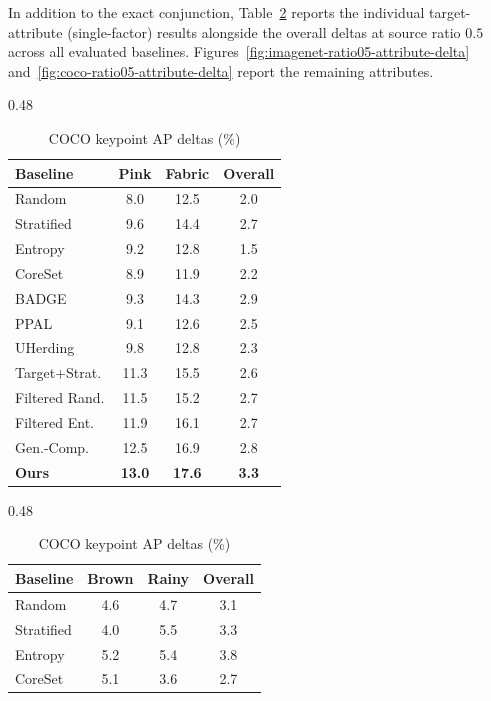 In addition to the exact conjunction, Table~\ref{tab:marginal-slice-deltas} reports the individual target-attribute (single-factor) results alongside the overall deltas at source ratio $0.5$ across all evaluated baselines. Figures~\ref{fig:imagenet-ratio05-attribute-delta} and~\ref{fig:coco-ratio05-attribute-delta} report the remaining attributes.

\begin{table}[t]
\centering
\caption{Marginal single-factor and overall performance deltas (\%) at source ratio $0.5$ across all evaluated baselines.}
\label{tab:marginal-slice-deltas}
\footnotesize
\setlength{\tabcolsep}{4.5pt}
\begin{subtable}[t]{0.48\linewidth}
\centering
\caption{ImageNet10 accuracy deltas (\%)}
\begin{tabular}{l c c c}
\toprule
\rowcolor{sectiongray} \textbf{Baseline} & \textbf{Pink} & \textbf{Fabric} & \textbf{Overall} \\
\midrule
Random & 8.0 & 12.5 & 2.0 \\
Stratified & 9.6 & 14.4 & 2.7 \\
Entropy & 9.2 & 12.8 & 1.5 \\
CoreSet & 8.9 & 11.9 & 2.2 \\
BADGE & 9.3 & 14.3 & 2.9 \\
PPAL & 9.1 & 12.6 & 2.5 \\
UHerding & 9.8 & 12.8 & 2.3 \\
Target+Strat. & 11.3 & 15.5 & 2.6 \\
Filtered Rand. & 11.5 & 15.2 & 2.7 \\
Filtered Ent. & 11.9 & 16.1 & 2.7 \\
Gen.-Comp. & 12.5 & 16.9 & 2.8 \\
\textbf{Ours} & \textbf{13.0} & \textbf{17.6} & \textbf{3.3} \\
\bottomrule
\end{tabular}
\end{subtable}%
\hfill
\begin{subtable}[t]{0.48\linewidth}
\centering
\caption{COCO keypoint AP deltas (\%)}
\begin{tabular}{l c c c}
\toprule
\rowcolor{sectiongray} \textbf{Baseline} & \textbf{Brown} & \textbf{Rainy} & \textbf{Overall} \\
\midrule
Random & 4.6 & 4.7 & 3.1 \\
Stratified & 4.0 & 5.5 & 3.3 \\
Entropy & 5.2 & 5.4 & 3.8 \\
CoreSet & 5.1 & 3.6 & 2.7 \\

\end{tabular}
\end{subtable}
\end{table}
